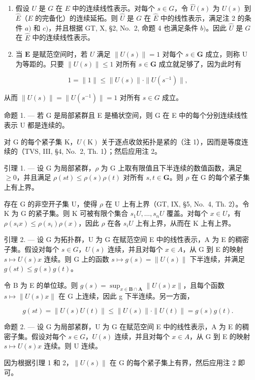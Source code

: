 \begin{enumerate}
\def\labelenumi{\arabic{enumi})}
\setcounter{enumi}{2}
\item
  假设 \(U\) 是 \(G\) 在 \(E\) 中的连续线性表示。对每个 \(s \in G\)，令 \(\widehat{U}(s)\) 为 \(U(s)\) 到 \(\widehat{E}\)（\(E\) 的完备化）的连续延拓。则 \(\widehat{U}\) 是 \(G\) 在 \(\widehat{E}\) 中的线性表示，满足注 2 的条件 \(a)\) 和 \(c)\)，并且根据 GT, X, §2, No.~2, 命题 4 也满足条件 \(b)\)。因此 \(\widehat{U}\) 是 \(G\) 在 \(\widehat{E}\) 中的连续线性表示。
\item
  当 \(\mathbf{E}\) 是赋范空间时，若 \(U\) 满足 \(\| U(s)\| = 1\) 对每个 \(s\in \mathbf{G}\) 成立，则称 U 为等距的。只要 \(\| U(s)\| \leqslant 1\) 对所有 \(s\in \mathbf{G}\) 成立就足够了，因为此时有
\end{enumerate}

\[
1 = \| 1 \| \leqslant \| U (s) \| \cdot \| U (s ^ {- 1}) \|,
\]

从而 \(\| U(s)\| = \| U(s^{-1})\| = 1\) 对所有 \(s\in G\) 成立。

命题 1. --- 若 G 是局部紧群且 E 是桶状空间，则 G 在 E 中的每个分别连续线性表示 U 都是连续的。

对 G 的每个紧子集 K，\(U(\mathrm{K})\) 关于逐点收敛拓扑是紧的（注 1），因而是等度连续的（TVS, III, §4, No.~2, Th. 1）；然后应用注 2。

引理 1. --- 设 G 为局部紧群，\(\rho\) 为 G 上取有限值且下半连续的数值函数，满足 \(\geqslant 0\)，并且满足 \(\rho(st) \leqslant \rho(s)\rho(t)\) 对所有 \(s, t \in \mathbf{G}\)。则 \(\rho\) 在 G 的每个紧子集上有上界。

存在 G 的非空开子集 U，使得 \(\rho\) 在 U 上有上界（GT, IX, §5, No.~4, Th. 2）。令 K 为 G 的紧子集。则 K 可被有限个集合 \(s_{1}U,\ldots,s_{n}U\) 覆盖。对每个 \(x\in U\)，有 \(\rho(s_{i}x)\leqslant\rho(s_{i})\rho(x)\)，因此 \(\rho\) 在各 \(s_{i}U\) 上有上界，从而在 K 上有上界。

引理 2. --- 设 G 为拓扑群，U 为 G 在赋范空间 E 中的线性表示，A 为 E 的稠密子集。假设对每个 \(s \in G\)，\(U(s)\) 连续，并且对每个 \(x \in A\)，从 G 到 E 的映射 \(s \mapsto U(s)x\) 连续。则 G 上的函数 \(s \mapsto g(s) = \|U(s)\|\) 下半连续，并满足 \(g(st) \leqslant g(s)g(t)\)。

令 B 为 E 的单位球。则 \(g(s) = \sup_{x \in \mathbf{B} \cap \mathbf{A}} \|U(s)x\|\)，且每个函数 \(s \mapsto \|U(s)x\|\) 在 G 上连续，因此 g 下半连续。另一方面，

\[
g (s t) = \| U (s) U (t) \| \leqslant \| U (s) \| \cdot \| U (t) \| = g (s) g (t).
\]

命题 2. --- 设 G 为局部紧群，U 为 G 在赋范空间 E 中的线性表示，A 为 E 的稠密子集。假设对每个 \(s \in G\)，\(U(s)\) 连续，并且对每个 \(x \in A\)，从 G 到 E 的映射 \(s \mapsto U(s)x\) 连续。则 U 连续。

因为根据引理 1 和 2，\(\|U(s)\|\) 在 G 的每个紧子集上有界，然后应用注 2 即可。

